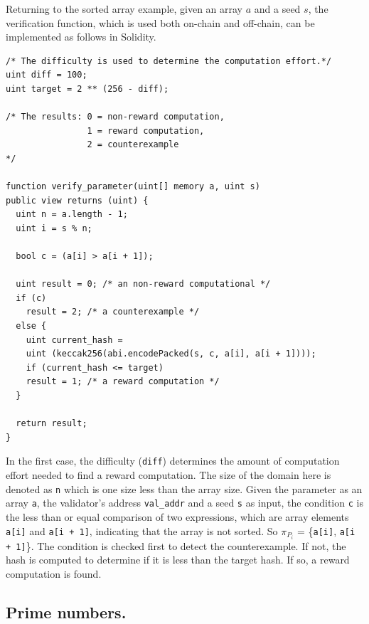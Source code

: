 \documentclass[runningheads]{llncs}
\begin{document}
Returning to the sorted array example, given an array $a$ and a seed $s$, the verification function, which is used both on-chain and off-chain, can be implemented as follows in Solidity.
\begin{lstlisting}[numbers=none]
/* The difficulty is used to determine the computation effort.*/
uint diff = 100;
uint target = 2 ** (256 - diff); 

/* The results: 0 = non-reward computation,
                1 = reward computation, 
                2 = counterexample 
*/

function verify_parameter(uint[] memory a, uint s)
public view returns (uint) {
  uint n = a.length - 1; 
  uint i = s % n;
       
  bool c = (a[i] > a[i + 1]);

  uint result = 0; /* an non-reward computational */ 
  if (c)  
    result = 2; /* a counterexample */
  else {
    uint current_hash = 
    uint (keccak256(abi.encodePacked(s, c, a[i], a[i + 1])));
    if (current_hash <= target) 
    result = 1; /* a reward computation */ 
  }             
  
  return result;           
}

\end{lstlisting}

In the first case, the difficulty (\lstinline|diff|) determines the amount of computation effort needed to find a reward computation. The size of the domain here is denoted as \lstinline|n| which is one size less than the array size. Given the parameter as an array \lstinline|a|, the validator's address  \lstinline|val_addr| and a seed \lstinline|s| as input, the condition \lstinline|c| is the less than or equal comparison of two expressions, which are array elements \lstinline|a[i]| and \lstinline|a[i + 1]|, indicating that the array is not sorted. So $\pi_{P_{i}}$ = \{\lstinline|a[i]|, \lstinline|a[i + 1]|\}. 
The condition is checked first to detect the counterexample. If not, the hash is computed to determine if it is less than the target hash. If so, a reward computation is found.

\subsection{Prime numbers.}
\end{document}
